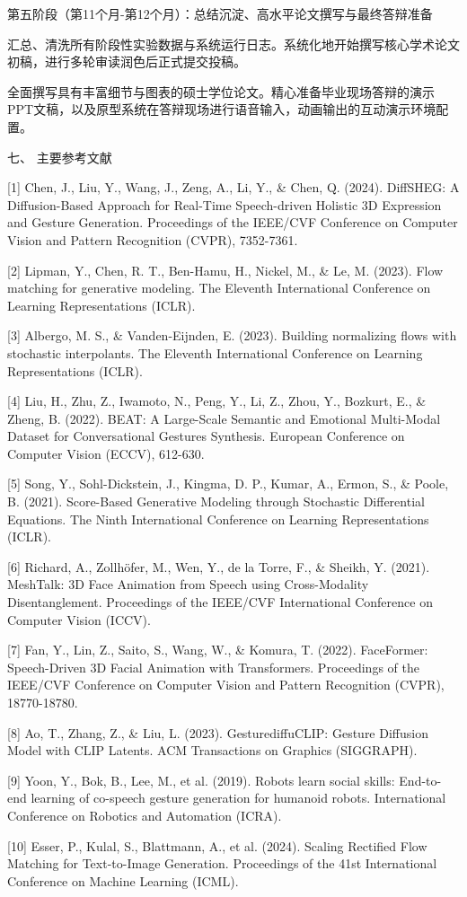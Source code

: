 \documentclass[UTF8]{ctexart}
\begin{document}
第五阶段（第11个月-第12个月）：总结沉淀、高水平论文撰写与最终答辩准备

汇总、清洗所有阶段性实验数据与系统运行日志。系统化地开始撰写核心学术论文初稿，进行多轮审读润色后正式提交投稿。

全面撰写具有丰富细节与图表的硕士学位论文。精心准备毕业现场答辩的演示PPT文稿，以及原型系统在答辩现场进行语音输入，动画输出的互动演示环境配置。

七、 主要参考文献

{[}1{]} Chen, J., Liu, Y., Wang, J., Zeng, A., Li, Y., \& Chen, Q.
(2024). DiffSHEG: A Diffusion-Based Approach for Real-Time Speech-driven
Holistic 3D Expression and Gesture Generation. Proceedings of the
IEEE/CVF Conference on Computer Vision and Pattern Recognition (CVPR),
7352-7361.

{[}2{]} Lipman, Y., Chen, R. T., Ben-Hamu, H., Nickel, M., \& Le, M.
(2023). Flow matching for generative modeling. The Eleventh
International Conference on Learning Representations (ICLR).

{[}3{]} Albergo, M. S., \& Vanden-Eijnden, E. (2023). Building
normalizing flows with stochastic interpolants. The Eleventh
International Conference on Learning Representations (ICLR).

{[}4{]} Liu, H., Zhu, Z., Iwamoto, N., Peng, Y., Li, Z., Zhou, Y.,
Bozkurt, E., \& Zheng, B. (2022). BEAT: A Large-Scale Semantic and
Emotional Multi-Modal Dataset for Conversational Gestures Synthesis.
European Conference on Computer Vision (ECCV), 612-630.

{[}5{]} Song, Y., Sohl-Dickstein, J., Kingma, D. P., Kumar, A., Ermon,
S., \& Poole, B. (2021). Score-Based Generative Modeling through
Stochastic Differential Equations. The Ninth International Conference on
Learning Representations (ICLR).

{[}6{]} Richard, A., Zollhöfer, M., Wen, Y., de la Torre, F., \& Sheikh,
Y. (2021). MeshTalk: 3D Face Animation from Speech using Cross-Modality
Disentanglement. Proceedings of the IEEE/CVF International Conference on
Computer Vision (ICCV).

{[}7{]} Fan, Y., Lin, Z., Saito, S., Wang, W., \& Komura, T. (2022).
FaceFormer: Speech-Driven 3D Facial Animation with Transformers.
Proceedings of the IEEE/CVF Conference on Computer Vision and Pattern
Recognition (CVPR), 18770-18780.

{[}8{]} Ao, T., Zhang, Z., \& Liu, L. (2023). GesturediffuCLIP: Gesture
Diffusion Model with CLIP Latents. ACM Transactions on Graphics
(SIGGRAPH).

{[}9{]} Yoon, Y., Bok, B., Lee, M., et al. (2019). Robots learn social
skills: End-to-end learning of co-speech gesture generation for humanoid
robots. International Conference on Robotics and Automation (ICRA).

{[}10{]} Esser, P., Kulal, S., Blattmann, A., et al. (2024). Scaling
Rectified Flow Matching for Text-to-Image Generation. Proceedings of the
41st International Conference on Machine Learning (ICML).
\end{document}
